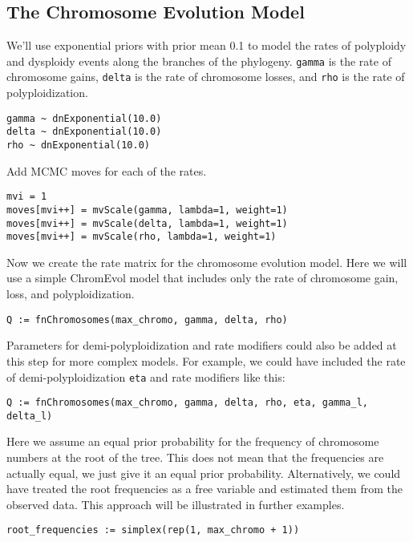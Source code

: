 \bigskip
\subsection{The Chromosome Evolution Model}


We'll use exponential priors with prior mean 0.1 to model the rates of polyploidy and 
dysploidy events along the branches of the phylogeny.
\texttt{gamma} is the rate of chromosome gains,
\texttt{delta} is the rate of chromosome losses, and
\texttt{rho} is the rate of polyploidization.
{\tt \begin{snugshade*}
\begin{lstlisting}
gamma ~ dnExponential(10.0)
delta ~ dnExponential(10.0)
rho ~ dnExponential(10.0)
\end{lstlisting}
\end{snugshade*}}

Add MCMC moves for each of the rates. 
{\tt \begin{snugshade*}
\begin{lstlisting}
mvi = 1
moves[mvi++] = mvScale(gamma, lambda=1, weight=1)
moves[mvi++] = mvScale(delta, lambda=1, weight=1)
moves[mvi++] = mvScale(rho, lambda=1, weight=1)
\end{lstlisting}
\end{snugshade*}}

Now we create the rate matrix for the chromosome evolution model.
Here we will use a simple ChromEvol model that includes
only the rate of chromosome gain, loss, and polyploidization.
{\tt \begin{snugshade*}
\begin{lstlisting}
Q := fnChromosomes(max_chromo, gamma, delta, rho)
\end{lstlisting}
\end{snugshade*}}

Parameters for demi-polyploidization and rate modifiers could also
be added at this step for more complex models. For example, we
could have included the rate of demi-polyploidization \texttt{eta} 
and rate modifiers like this:
{\tt \begin{snugshade*}
\begin{lstlisting}
Q := fnChromosomes(max_chromo, gamma, delta, rho, eta, gamma_l, delta_l)
\end{lstlisting}
\end{snugshade*}}

Here we assume an equal prior probability for the frequency of chromosome numbers at the root of the tree. 
This does not mean that the frequencies are actually equal, we just give it an equal prior probability.
Alternatively, we could have treated the root frequencies as a free variable and estimated them from the observed data. 
This approach will be illustrated in further examples.
{\tt \begin{snugshade*}
\begin{lstlisting}
root_frequencies := simplex(rep(1, max_chromo + 1))
\end{lstlisting}
\end{snugshade*}}

